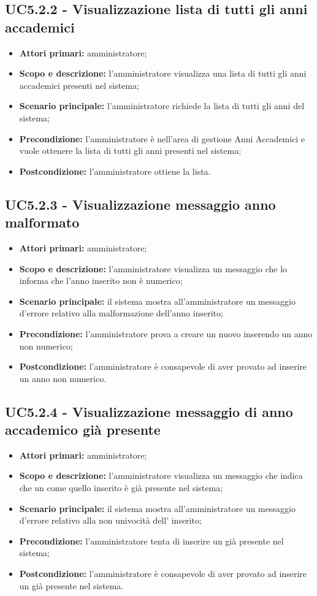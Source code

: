 \documentclass[AnalisiDeiRequisiti.tex]{subfiles}
\begin{document}
\subsection{UC5.2.2 - Visualizzazione lista di tutti gli anni accademici}
\begin{itemize}
	\item \textbf{Attori primari:} amministratore;
	\item \textbf{Scopo e descrizione:} l'amministratore visualizza una lista di tutti gli anni accademici presenti nel sistema;
	\item \textbf{Scenario principale:} l'amministratore richiede la lista di tutti gli anni del sistema;
	\item \textbf{Precondizione:} l'amministratore è nell'area di gestione Anni Accademici e vuole ottenere la lista di tutti gli anni presenti nel sistema; 
	\item \textbf{Postcondizione:} l'amministratore ottiene la lista.
\end{itemize}
\subsection{UC5.2.3 - Visualizzazione messaggio anno malformato}
\begin{itemize}
	\item \textbf{Attori primari:} amministratore;
	\item \textbf{Scopo e descrizione:} l'amministratore visualizza un messaggio che lo informa che l'anno inserito non è numerico;
	\item \textbf{Scenario principale:} il sistema mostra all'amministratore un messaggio d'errore relativo alla malformazione dell'anno inserito;
	\item \textbf{Precondizione:} l'amministratore prova a creare un nuovo  inserendo un anno non numerico; 
	\item \textbf{Postcondizione:} l'amministratore è consapevole di aver provato ad inserire un anno non numerico.
\end{itemize}
\subsection{UC5.2.4 - Visualizzazione messaggio di anno accademico già presente}
\begin{itemize}
	\item \textbf{Attori primari:} amministratore;
	\item \textbf{Scopo e descrizione:} l'amministratore visualizza un messaggio che indica che un  come quello inserito è già presente nel sistema;
	\item \textbf{Scenario principale:} il sistema mostra all'amministratore un messaggio d'errore relativo alla non univocità dell' inserito;
	\item \textbf{Precondizione:} l'amministratore tenta di inserire un  già presente nel sistema; 
	\item \textbf{Postcondizione:} l'amministratore è consapevole di aver provato ad inserire un  già presente nel sistema.
\end{itemize}
\end{document}
